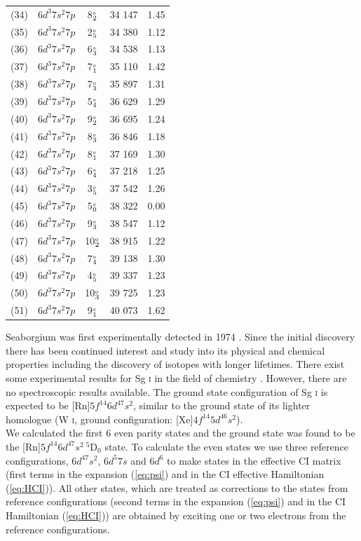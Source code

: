 \documentclass[10pt,a4paper, twoside, openright]{report}
\begin{document}
{\begin{longtable}{cl@{\hspace{0.5cm}}c@{\hspace{0.5cm}}r@{\hspace{0.5cm}}r}
(34) & $6d^3 7s^2 7p$  & 8$_2^{\rm_o}$  & 34 147 & 1.45 \\
(35) & $6d^3 7s^2 7p$  &  2$_{5}^{\rm_o}$ & 34 380 & 1.12  \\  
(36) & $6d^3 7s^2 7p$  & 6$_3^{\rm_o}$  & 34 538 & 1.13  \\
(37) & $6d^3 7s^2 7p$  & 7$_1^{\rm_o}$  & 35 110 & 1.42 \\
(38) & $6d^3 7s^2 7p$  & 7$_3^{\rm_o}$  & 35 897 & 1.31  \\
(39) & $6d^3 7s^2 7p$  &  5$_4^{\rm_o}$ & 36 629 & 1.29  \\
(40) & $6d^3 7s^2 7p$  & 9$_2^{\rm_o}$  & 36 695 & 1.24 \\
(41) & $6d^3 7s^2 7p$ & 8$_3^{\rm_o}$  & 36 846 & 1.18 \\
(42) & $6d^3 7s^2 7p$  & 8$_1^{\rm_o}$  & 37 169 & 1.30 \\
(43) & $6d^3 7s^2 7p$  &  6$_4^{\rm_o}$& 37 218 & 1.25 \\
(44) & $6d^3 7s^2 7p$  &  3$_{5}^{\rm_o}$ & 37 542 & 1.26 \\
(45) & $6d^3 7s^2 7p$  &  5$_0^{\rm_o}$  & 38 322 & 0.00 \\ 
(46) & $6d^3 7s^2 7p$  & 9$_3^{\rm_o}$  & 38 547 & 1.12 \\ 
(47) & $6d^3 7s^2 7p$  & 10$_2^{\rm_o}$  & 38 915 & 1.22 \\ 
(48) & $6d^3 7s^2 7p$  &  7$_4^{\rm_o}$ & 39 138 & 1.30 \\
(49) & $6d^3 7s^2 7p$  &  4$_{5}^{\rm_o}$ & 39 337 & 1.23 \\
(50) & $6d^3 7s^2 7p$  & 10$_3^{\rm_o}$  & 39 725 & 1.23 \\
(51) & $6d^3 7s^2 7p$  & 9$_1^{\rm_o}$  & 40 073 & 1.62 \\ 
  \bottomrule
 \bottomrule
 \end{longtable} 
 }
Seaborgium was first experimentally detected in 1974 \cite{Ghoirso1974}. Since the initial discovery there has been continued interest and study into its physical and chemical properties including the discovery of isotopes with longer lifetimes. There exist some experimental results for Sg \textsc{i} in the field of chemistry \cite{Schadel2012}. However, there are no spectroscopic results available.   The ground state configuration of Sg \textsc{i} is expected to be [Rn]$5f^{14}6d^47s^2$, similar to the ground state of its lighter homologue (W \textsc{i}, ground configuration:  [Xe]$4f^{14}5d^46s^2$). \\
\linebreak
We calculated the first 6 even parity states and the ground state was found  to be the [Rn]$5f^{14}6d^47s^2 \ ^5$D$_0$ state. To calculate the even states we use three reference configurations, $6d^47s^2$, $6d^5 7s$ and $6d^6$ to make states in the effective CI matrix (first terms in the expansion (\ref{eq:psi}) and in the CI effective Hamiltonian (\ref{eq:HCI})). All other states, which are treated as corrections to the states from reference configurations (second terms in the expansion (\ref{eq:psi}) and in the CI Hamiltonian (\ref{eq:HCI})) are obtained by exciting one or two electrons from the reference configurations.
\end{document}
